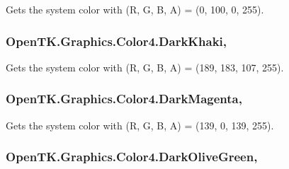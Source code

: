 Gets the system color with (R, G, B, A) = (0, 100, 0, 255). 

\hypertarget{struct_open_t_k_1_1_graphics_1_1_color4_ab891fb5db04cbf696746708a96574d85}{
\subsubsection[{Dark\-Khaki}]{ Open\-T\-K.\-Graphics.\-Color4.\-Dark\-Khaki\hspace{0.3cm}{\ttfamily [static]}, {\ttfamily [get]}}}\label{struct_open_t_k_1_1_graphics_1_1_color4_ab891fb5db04cbf696746708a96574d85}


Gets the system color with (R, G, B, A) = (189, 183, 107, 255). 

\hypertarget{struct_open_t_k_1_1_graphics_1_1_color4_a0a8a6e5ded40bb62218118e2cea7712a}{
\subsubsection[{Dark\-Magenta}]{ Open\-T\-K.\-Graphics.\-Color4.\-Dark\-Magenta\hspace{0.3cm}{\ttfamily [static]}, {\ttfamily [get]}}}\label{struct_open_t_k_1_1_graphics_1_1_color4_a0a8a6e5ded40bb62218118e2cea7712a}


Gets the system color with (R, G, B, A) = (139, 0, 139, 255). 

\hypertarget{struct_open_t_k_1_1_graphics_1_1_color4_a27752debe35812e0f48843d273b54764}{
\subsubsection[{Dark\-Olive\-Green}]{ Open\-T\-K.\-Graphics.\-Color4.\-Dark\-Olive\-Green\hspace{0.3cm}{\ttfamily [static]}, {\ttfamily [get]}}}\label{struct_open_t_k_1_1_graphics_1_1_color4_a27752debe35812e0f48843d273b54764}


